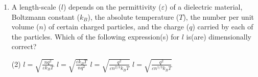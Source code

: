 \begin{enumerate}
    \item A length-scale (\(l\)) depends on the permittivity (\(\varepsilon\)) of a dielectric material, Boltzmann constant (\(k_B\)), the absolute temperature (\(T\)), the number per unit volume (\(n\)) of certain charged particles, and the charge (\(q\)) carried by each of the particles. Which of the following expression(s) for \(l\) is(are) dimensionally correct?
        \begin{tasks}(2)
            \task \(l = \sqrt{\frac{nq^2}{\varepsilon k_B T}}\)
            \task \(l = \sqrt{\frac{\varepsilon k_B T}{nq^2}}\)
            \task \(l = \sqrt{\frac{q^2}{\varepsilon n^{2/3} k_B T}}\)
            \task \(l = \sqrt{\frac{q^2}{\varepsilon n^{1/3} k_B T}}\)
        \end{tasks}
\end{enumerate}